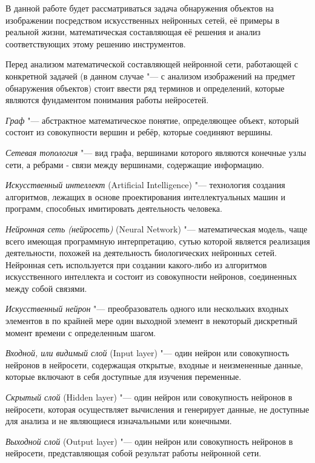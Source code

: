 \documentclass[bachelor, och, coursework]{SCWorks}
\begin{document}
    В данной работе будет рассматриваться задача обнаружения объектов на изображении посредством искусственных нейронных сетей, её примеры в реальной жизни, математическая составляющая её решения и анализ соответствующих этому решению инструментов.


    Перед анализом математической составляющей нейронной сети, работающей с конкретной задачей (в данном случае "--- с анализом изображений на предмет обнаружения объектов) стоит ввести ряд терминов и определений, которые являются фундаментом понимания работы нейросетей.

    \textit{Граф} "--- абстрактное математическое понятие, определяющее объект, который состоит из совокупности вершин и ребёр, которые соединяют вершины.

    \textit{Сетевая топология} "--- вид графа, вершинами которого являются конечные узлы сети, а ребрами - связи между вершинами, содержащие информацию.

    \textit{Искусственный интеллект} (Artificial Intelligence) "--- технология создания алгоритмов, лежащих в основе проектирования интеллектуальных машин и программ, способных имитировать деятельность человека.

    \textit{Нейронная сеть (нейросеть)} (Neural Network) "--- математическая модель, чаще всего имеющая программную интерпретацию, сутью которой является реализация деятельности, похожей на деятельность биологических нейронных сетей. Нейронная сеть используется при создании какого-либо из алгоритмов искусственного интеллекта и состоит из совокупности нейронов, соединенных между собой связями. 

    \textit{Искусственный нейрон} "--- преобразователь одного или нескольких входных элементов в по крайней мере один выходной элемент в некоторый дискретный момент времени с определенным шагом.

    \textit{Входной, или видимый слой} (Input layer) "--- один нейрон или совокупность нейронов в нейросети, содержащая открытые, входные и неизмененные данные, которые включают в себя доступные для изучения переменные.

    \textit{Скрытый слой} (Hidden layer) "--- один нейрон или совокупность нейронов в нейросети, которая осуществляет вычисления и генерирует данные, не доступные для анализа и не являющиеся изначальными или конечными.

    \textit{Выходной слой} (Output layer) "--- один нейрон или совокупность нейронов в нейросети, представляющая собой результат работы нейронной сети.
\end{document}
